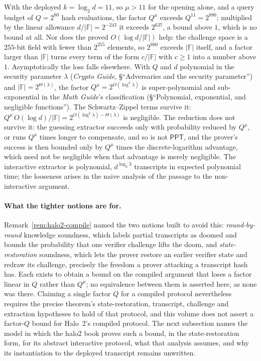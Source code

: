 \documentclass[11pt,a4paper]{article}
\theoremstyle{definition}
\newcommand{\F}{\mathbb{F}}
\newcommand{\PPT}{\mathsf{PPT}}
\begin{document}
With the deployed $k = \log_2 d = 11$, so $\mu > 11$ for the opening
alone, and a query budget of $Q = 2^{80}$ hash evaluations, the factor
$Q^{\mu}$ exceeds $Q^{11} = 2^{880}$; multiplied by the linear allowance
$d/|\F| = 2^{-243}$ it exceeds $2^{637}$, a bound above $1$, which is no
bound at all. Nor does the proved $O(\log d/|\F|)$ help: the challenge
space is a $255$-bit field with fewer than $2^{255}$ elements, so
$2^{880}$ exceeds $|\F|$ itself, and a factor larger than $|\F|$ turns
every term of the form $c/|\F|$ with $c \ge 1$ into a number above $1$.
Asymptotically the loss falls elsewhere. With $Q$ and $d$ polynomial in
the security parameter $\lambda$ (\emph{Crypto Guide}, \S``Adversaries
and the security parameter'') and $|\F| = 2^{\Theta(\lambda)}$, the factor
$Q^{\mu} = 2^{O(\log^{2}\lambda)}$ is super-polynomial and
sub-exponential in the \emph{Math Guide}'s classification
(\S``Polynomial, exponential, and negligible functions''). The
Schwartz--Zippel terms survive it:
$Q^{\mu}\,O(\log d)/|\F| = 2^{O(\log^{2}\lambda) - \Theta(\lambda)}$ is
negligible. The reduction does not survive it: the guessing extractor
succeeds only with probability reduced by $Q^{\mu}$, or runs $Q^{\mu}$
times longer to compensate, and so is not $\PPT$, and the prover's
success is then bounded only by $Q^{\mu}$ times the discrete-logarithm
advantage, which need not be negligible when that advantage is merely
negligible. The interactive extractor is polynomial,
$d^{\log_2 3}$ transcripts in expected polynomial time; the looseness
arises in the naive analysis of the passage to the non-interactive
argument.

\paragraph{What the tighter notions are for.}
Remark~\ref{rem:halo2-compile} named the two notions built to avoid
this: \emph{round-by-round} knowledge soundness, which labels partial
transcripts as doomed and bounds the probability that one verifier
challenge lifts the doom, and \emph{state-restoration} soundness, which
lets the prover restore an earlier verifier state and redraw its
challenge, precisely the freedom a prover attacking a transcript hash
has. Each exists to obtain a bound on the compiled argument that loses
a factor linear in $Q$ rather than $Q^{\mu}$; no equivalence between
them is asserted here, as none was there. Claiming a single factor $Q$
for a compiled protocol nevertheless requires the precise theorem's
state-restoration, transcript, challenge and extraction hypotheses to
hold of that protocol, and this volume does not assert a factor-$Q$
bound for Halo~2's compiled protocol. The next subsection names the
model in which the halo2 book proves such a bound, in the
state-restoration form, for its abstract interactive protocol, what
that analysis assumes, and why its instantiation to the deployed
transcript remains unwritten.
\end{document}
